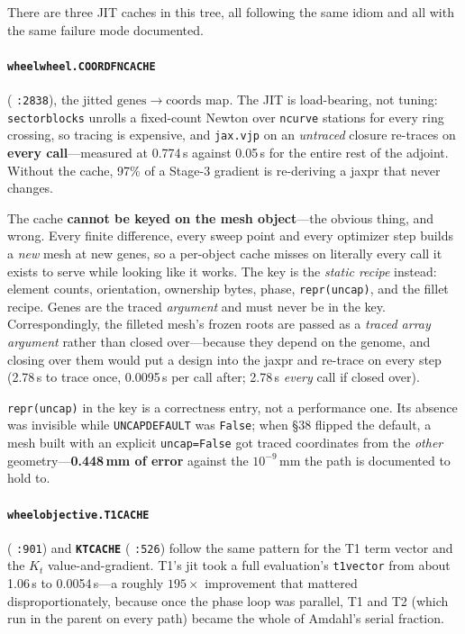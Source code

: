 \documentclass[11pt,a4paper]{article}
\DeclareRobustCommand{\code}[1]{%
  \texttt{\small\def\_{\textunderscore\discretionary{}{}{}}#1}}
\begin{document}
There are three JIT caches in this tree, all following the same idiom and all with the
same failure mode documented.

\paragraph{\code{wheel\_wheel.\_COORD\_FN\_CACHE}} (\code{:2838}), the jitted
$\mathrm{genes} \to \mathrm{coords}$ map. The JIT is load-bearing, not tuning:
\code{sector\_blocks} unrolls a fixed-count Newton over \code{n\_curve} stations for
every ring crossing, so tracing is expensive, and \code{jax.vjp} on an \emph{untraced}
closure re-traces on \textbf{every call}---measured at 0.774\,s against 0.05\,s for the
entire rest of the adjoint. Without the cache, 97\% of a Stage-3 gradient is re-deriving
a jaxpr that never changes.

The cache \textbf{cannot be keyed on the mesh object}---the obvious thing, and wrong.
Every finite difference, every sweep point and every optimizer step builds a \emph{new}
mesh at new genes, so a per-object cache misses on literally every call it exists to
serve while looking like it works. The key is the \emph{static recipe} instead: element
counts, orientation, ownership bytes, phase, \code{repr(uncap)}, and the fillet recipe.
Genes are the traced \emph{argument} and must never be in the key. Correspondingly, the
filleted mesh's frozen roots are passed as a \emph{traced array argument} rather than
closed over---because they depend on the genome, and closing over them would put a
design into the jaxpr and re-trace on every step (2.78\,s to trace once, 0.0095\,s per
call after; 2.78\,s \emph{every} call if closed over).

\code{repr(uncap)} in the key is a correctness entry, not a performance one. Its absence
was invisible while \code{UNCAP\_DEFAULT} was \code{False}; when \S38 flipped the
default, a mesh built with an explicit \code{uncap=False} got traced coordinates from
the \emph{other} geometry---\textbf{0.448\,mm of error} against the $10^{-9}$\,mm the
path is documented to hold to.

\paragraph{\code{wheel\_objective.\_T1\_CACHE}} (\code{:901}) and
\textbf{\code{\_KT\_CACHE}} (\code{:526}) follow the same pattern for the T1 term vector
and the $K_t$ value-and-gradient. T1's jit took a full evaluation's \code{t1\_vector}
from about 1.06\,s to 0.0054\,s---a roughly $195\times$ improvement that mattered
disproportionately, because once the phase loop was parallel, T1 and T2 (which run in
the parent on every path) became the whole of Amdahl's serial fraction.
\end{document}
